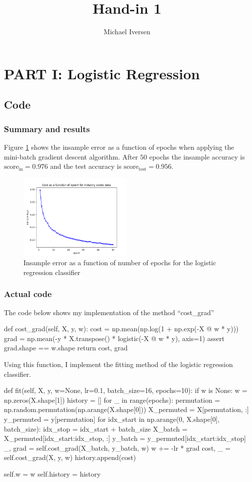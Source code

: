 \documentclass{article}
\title{Hand-in 1}
\author{Michael Iversen}
\begin{document}
\maketitle
\section*{PART I: Logistic Regression}
	\subsection*{Code}
	\subsubsection*{Summary and results}
	Figure \ref{fig:logreg} shows the insample error as a function of epochs when applying the mini-batch gradient descent algorithm.
	After $50$ epochs the insample accuracy is $\mathrm{score}_\mathrm{in} = 0.976$ and the test accuracy is $\mathrm{score}_\mathrm{test} = 0.956$.
	\begin{figure}
		\centering
		\includegraphics[width=0.5\textwidth]{logreg_text_cost_per_epoch.png}
		\caption{Insample error as a function of number of epochs for the logistic regression classifier}
		\label{fig:logreg}
	\end{figure}
	\subsubsection*{Actual code}
	The code below shows my implementation of the method ``cost\_grad''
	\begin{python}
def cost_grad(self, X, y, w):
	cost = np.mean(np.log(1 + np.exp(-X @ w * y)))
	grad = np.mean(-y * X.transpose() * logistic(-X @ w * y), axis=1)
	assert grad.shape == w.shape
	return cost, grad
	\end{python}
	Using this function, I implement the fitting method of the logistic regression classifier.
	\begin{python}
def fit(self, X, y, w=None, lr=0.1, batch_size=16, epochs=10):
	if w is None:
		w = np.zeros(X.shape[1])
	history = []
	for _ in range(epochs):
		permutation = np.random.permutation(np.arange(X.shape[0]))
		X_permuted = X[permutation, :]
		y_permuted = y[permutation]
		for idx_start in np.arange(0, X.shape[0], batch_size):
			idx_stop = idx_start + batch_size
			X_batch = X_permuted[idx_start:idx_stop, :]
			y_batch = y_permuted[idx_start:idx_stop]
			_, grad = self.cost_grad(X_batch, y_batch, w)
			w += -lr * grad
		cost, _ = self.cost_grad(X, y, w)
		history.append(cost)

	self.w = w
	self.history = history
	\end{python}
\end{document}
